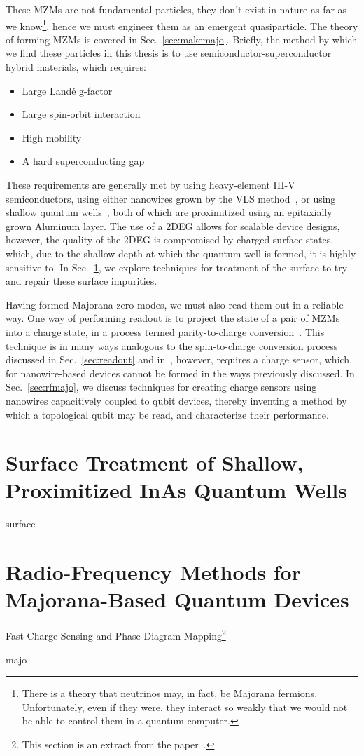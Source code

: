 These MZMs are not fundamental particles, they don't exist in nature as far as we know\footnote{There is a theory that neutrinos may, in
fact, be Majorana fermions. Unfortunately, even if they were, they interact so weakly that we would not be able to control them in a quantum computer.},
hence we must engineer them as an emergent quasiparticle. The theory of forming MZMs is covered in Sec.~\ref{sec:makemajo}. Briefly, the method by
which we find these particles in this thesis is to use semiconductor-superconductor hybrid materials, which requires:
\begin{itemize}
    \item Large Land\'e g-factor
    \item Large spin-orbit interaction
    \item High mobility
    \item A hard superconducting gap
\end{itemize}
These requirements are generally met by using heavy-element III-V semiconductors, using either nanowires grown by the VLS method~\cite{nnano.2014.306,Krogstrup},
or using shallow quantum wells~\cite{PhysRevB.93.155402}, both of which are proximitized using an epitaxially grown Aluminum layer. The use of a 2DEG allows
for scalable device designs, however, the quality of the 2DEG is compromised by charged surface states, which, due to the shallow depth at which the quantum
well is formed, it is highly sensitive to. In Sec.~\ref{sec:inas_hb}, we explore techniques for treatment of the surface to try and repair these surface impurities.

Having formed Majorana zero modes, we must also read them out in a reliable way. One way of performing readout is to project the state of a pair of MZMs into
a charge state, in a process termed parity-to-charge conversion~\cite{AasenPRX16}. This technique is in many ways analogous to the spin-to-charge conversion
process discussed in Sec.~\ref{sec:readout} and in~\cite{petta,RevModPhys.79.1217}, however, requires a charge sensor, which, for nanowire-based devices cannot
be formed in the ways previously discussed. In Sec.~\ref{sec:rfmajo}, we discuss techniques for creating charge sensors using nanowires capacitively coupled
to qubit devices, thereby inventing a method by which a topological qubit may be read, and characterize their performance.

\clearpage
\section{Surface Treatment of Shallow, Proximitized InAs Quantum Wells}
\label{sec:inas_hb}
{surface}

\clearpage
\section{Radio-Frequency Methods for {Majorana-Based} {Quantum} {Devices}}
{\large \bf \begin{center}Fast Charge Sensing and Phase-Diagram Mapping\footnote{
    This section is an extract from the paper~\cite{PhysRevApplied.11.064011}.
}\end{center}}
\label{sec:rfmajo}
{majo}

